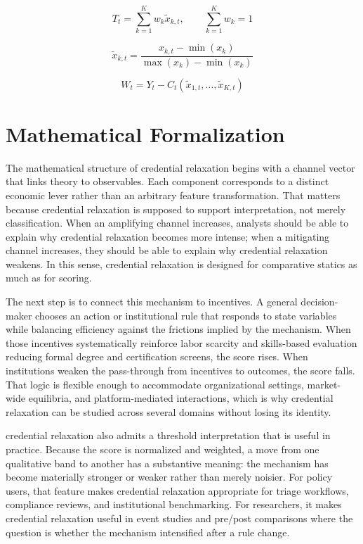 \documentclass[12pt]{article}
\begin{document}
\begin{equation}
T_t = \sum_{k=1}^K w_k \tilde{x}_{k,t}, \qquad \sum_{k=1}^K w_k = 1
\label{eq:index}
\end{equation}

\begin{equation}
\tilde{x}_{k,t} = \frac{x_{k,t} - \min(x_k)}{\max(x_k) - \min(x_k)}
\label{eq:norm}
\end{equation}

\begin{equation}
W_t = Y_t - C_t(\tilde{x}_{1,t}, \dots, \tilde{x}_{K,t})
\label{eq:welfare}
\end{equation}

\section{Mathematical Formalization}
The mathematical structure of credential relaxation begins with a channel vector that links theory to observables. Each component corresponds to a distinct economic lever rather than an arbitrary feature transformation. That matters because credential relaxation is supposed to support interpretation, not merely classification. When an amplifying channel increases, analysts should be able to explain why credential relaxation becomes more intense; when a mitigating channel increases, they should be able to explain why credential relaxation weakens. In this sense, credential relaxation is designed for comparative statics as much as for scoring.

The next step is to connect this mechanism to incentives. A general decision-maker chooses an action or institutional rule that responds to state variables while balancing efficiency against the frictions implied by the mechanism. When those incentives systematically reinforce labor scarcity and skills-based evaluation reducing formal degree and certification screens, the score rises. When institutions weaken the pass-through from incentives to outcomes, the score falls. That logic is flexible enough to accommodate organizational settings, market-wide equilibria, and platform-mediated interactions, which is why credential relaxation can be studied across several domains without losing its identity.

credential relaxation also admits a threshold interpretation that is useful in practice. Because the score is normalized and weighted, a move from one qualitative band to another has a substantive meaning: the mechanism has become materially stronger or weaker rather than merely noisier. For policy users, that feature makes credential relaxation appropriate for triage workflows, compliance reviews, and institutional benchmarking. For researchers, it makes credential relaxation useful in event studies and pre/post comparisons where the question is whether the mechanism intensified after a rule change.
\end{document}
